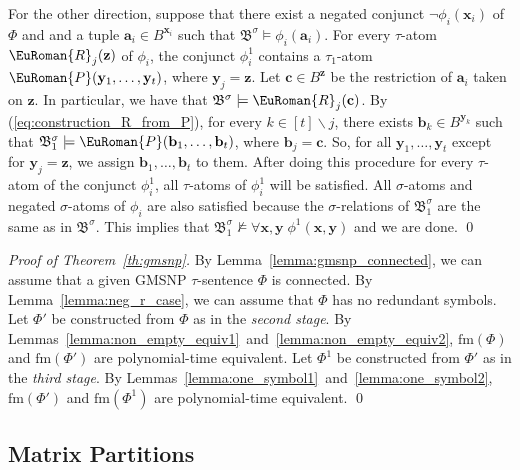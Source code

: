 \documentclass[10pt,a4paper]{amsart}
\theoremstyle{plain}
\theoremstyle{definition}
\numberwithin{equation}{section}
\renewcommand{\proof}[1][Proof]{\par\noindent\textit{#1.}\enspace\ignorespaces}
\newcommand{\eurm}[1]{\EuRoman{#1}} %
\newcommand{\structure}[1]{\mathfrak{#1}} %
\newcommand{\tuple}[1]{\mathbf{#1}} %
\newcommand{\rel}[1]{\eurm{#1}} %
\newcommand{\Sat}[0]{\ensuremath{\mathrm{fm}}}
\renewcommand{\setminus}{\smallsetminus}
\begin{document}
For the other direction, suppose that there exist a negated conjunct $\neg\phi_i(\tuple{x}_i)$ of $\Phi$ and and a tuple $\tuple{a}_i\in B^{\tuple{x}_i}$ such that $\structure{B}^\sigma\models\phi_i (\tuple{a}_i)$.
For every $\tau$-atom $\rel{R}_j(\tuple{z})$ of $\phi_i$, the conjunct $\phi_i^1$ contains a $\tau_1$-atom $\rel{P}(\tuple{y}_1,\ldots,\tuple{y}_t)$, where $\tuple{y}_j=\tuple{z}$.
Let $\tuple{c}\in B^{\tuple{z}}$ be the restriction of $\tuple{a}_i$ taken on $\tuple{z}$.
In particular, we have that $\structure{B}^\sigma\models\rel{R}_j(\tuple{c})$.
By (\ref{eq:construction_R_from_P}), for every $k\in[t]\setminus j$, there exists $\tuple{b}_k\in B^{\tuple{y}_k}$ such that $\structure{B}_1^\sigma\models\rel{P}(\tuple{b}_1,\ldots,\tuple{b}_t)$, where $\tuple{b}_j=\tuple{c}$.
So, for all $\tuple{y}_1,\ldots,\tuple{y}_t$ except for $\tuple{y}_j=\tuple{z}$, we assign $\tuple{b}_1,\ldots,\tuple{b}_t$ to them.
After doing this procedure for every $\tau$-atom of the conjunct $\phi_i^1$, all $\tau$-atoms of $\phi_i^1$ will be satisfied.
All $\sigma$-atoms and negated $\sigma$-atoms of $\phi_i$ are also satisfied because the $\sigma$-relations of $\structure{B}_1^\sigma$ are the same as in $\structure{B}^\sigma$.
This implies that $\structure{B}_1^\sigma\not\models\forall\tuple{x},\tuple{y}\;\phi^1(\tuple{x},\tuple{y})$ and we are done.
\qed


\proof[Proof of Theorem~\ref{th:gmsnp}]
By Lemma~\ref{lemma:gmsnp_connected}, we can assume that a given GMSNP $\tau$-sentence $\Phi$ is connected.
%
By Lemma~\ref{lemma:neg_r_case}, we can assume that $\Phi$ has no redundant symbols.
%
Let $\Phi'$ be constructed from $\Phi$ as in the \emph{second stage}.
%
By Lemmas~\ref{lemma:non_empty_equiv1}~and~\ref{lemma:non_empty_equiv2}, $\Sat(\Phi)$ and $\Sat(\Phi')$ are polynomial-time equivalent.
%
Let $\Phi^1$ be constructed from $\Phi'$ as in the \emph{third stage}.
%
By Lemmas~\ref{lemma:one_symbol1}~and~\ref{lemma:one_symbol2}, $\Sat(\Phi')$ and $\Sat(\Phi^1)$ are polynomial-time equivalent.
\qed

















\subsection{Matrix Partitions}\label{section:mp}
\end{document}
